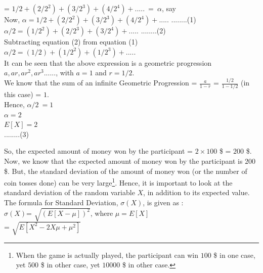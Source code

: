 \documentclass{llncs}
\begin{document}
= $1/2+(2/2^2)+(3/2^3)+(4/2^4)+.....\ =\ \alpha$, say\\

Now, $\alpha = 1/2+(2/2^2)+(3/2^3)+(4/2^4)+.....$ \hspace{5mm} ........(1)\\

$\alpha/2 = (1/2^2)+(2/2^3)+(3/2^4)+.....$\hspace{5mm} ........(2)\\

Subtracting equation (2) from equation (1) \\

$\alpha/2= (1/2)+(1/2^2)+(1/2^3)+.....$\\

It can be seen that the above expression is a geometric progression $a,ar,ar^2,ar^3......$, with $a=1$ and $r=1/2$.\\

We know that the sum of an infinite Geometric Progression = $\frac{a}{1-r}$ = $\frac{1/2}{1-1/2}$ (in this case) = $1$. \\

Hence, $\alpha/2\ = 1$\\

$\alpha=2$\\

$E[X]=2$\\  	\hspace{5mm} ........(3)

So, the expected amount of money won by the participant = $2 \times 100$ \$ = $200$ \$.\\

Now, we know that the expected amount of money won by the participant is $200$ \$. But, the standard deviation of the amount of money won (or the number of coin tosses done) can be very large\footnote{When the game is actually played, the participant can win $100$ \$ in one case, yet $500$ \$ in other case, yet $10000$ \$ in other case.}. Hence, it is important to look at the standard deviation of the random variable $X$, in addition to its expected value.\\

The formula for Standard Deviation, $\sigma(X)$, is given as :\\ 

$\sigma(X)$= $ \sqrt{(E[X- \mu])^2} $, where $\mu = E[X]$\\


= $ \sqrt{E[X^2 - 2 X \mu + \mu ^ 2]} $\\
\end{document}
